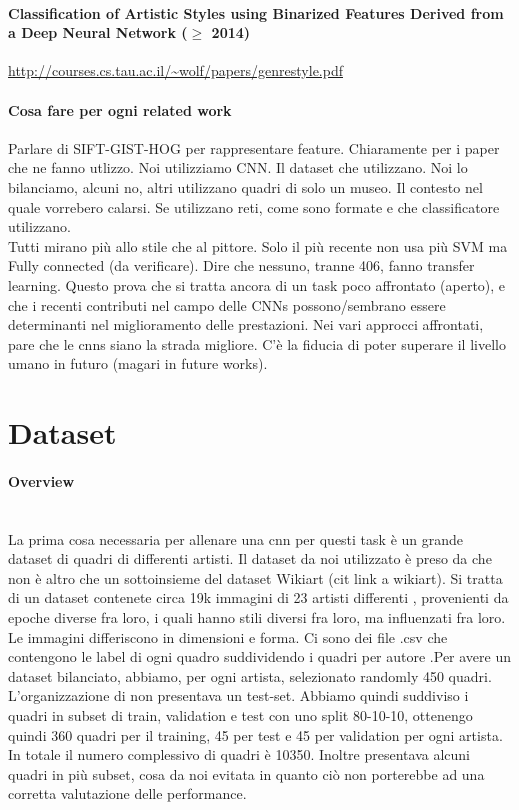 \documentclass{article}
\begin{document}
\paragraph{Classification of Artistic Styles using Binarized
	Features Derived from a Deep Neural Network ($\geq$ 2014)}\url{http://courses.cs.tau.ac.il/~wolf/papers/genrestyle.pdf}\\

\paragraph{Cosa fare per ogni related work}

Parlare di SIFT-GIST-HOG per rappresentare feature. Chiaramente per i paper che ne fanno utlizzo. Noi utilizziamo CNN. Il dataset che utilizzano. Noi lo bilanciamo, alcuni no, altri utilizzano quadri di solo un museo. Il contesto nel quale vorrebero calarsi. Se utilizzano reti, come sono formate e che classificatore utilizzano. \\
Tutti mirano più allo stile che al pittore. Solo il più recente non usa più SVM ma Fully connected (da verificare). Dire che nessuno, tranne 406, fanno transfer learning. Questo prova che si tratta ancora di un task poco affrontato (aperto), e che i recenti contributi nel campo delle CNNs possono/sembrano essere determinanti nel miglioramento delle prestazioni. Nei vari approcci affrontati, pare che le cnns siano la strada migliore. C'è la fiducia di poter superare il livello umano in futuro (magari in future works).
\section{Dataset}

\paragraph{Overview}\mbox{}\\
La prima cosa necessaria per allenare una cnn per questi task è un grande dataset di quadri di differenti artisti. Il dataset da noi utilizzato è preso da \cite{ArtGANDataset} che non è altro che un sottoinsieme del dataset Wikiart (cit link a wikiart). Si tratta di un dataset contenete circa 19k immagini di 23 artisti differenti , provenienti da epoche diverse fra loro, i quali hanno stili diversi fra loro, ma influenzati fra loro. Le immagini differiscono in dimensioni e forma.  Ci sono dei file .csv che contengono le label di ogni quadro suddividendo i quadri per  autore .Per avere un dataset bilanciato, abbiamo, per ogni artista, selezionato randomly 450 quadri.
L'organizzazione di \cite{ArtGANDataset} non presentava un test-set. Abbiamo quindi suddiviso i quadri in subset di train, validation e test con uno split 80-10-10, ottenengo quindi 360 quadri per il training, 45 per test e 45 per validation per ogni artista. In totale il numero complessivo di quadri è 10350.
Inoltre \cite{ArtGANDataset} presentava alcuni quadri in più subset, cosa da noi evitata in quanto ciò non porterebbe ad una corretta valutazione delle performance.
\end{document}
